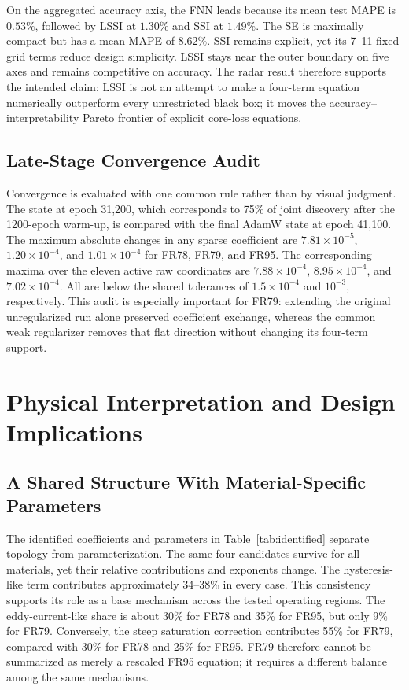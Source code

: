 \documentclass[lettersize,journal]{IEEEtran}
\begin{document}
On the aggregated accuracy axis, the FNN leads because its mean test MAPE is $0.53\%$, followed by LSSI at $1.30\%$ and SSI at $1.49\%$. The SE is maximally compact but has a mean MAPE of $8.62\%$. SSI remains explicit, yet its 7--11 fixed-grid terms reduce design simplicity. LSSI stays near the outer boundary on five axes and remains competitive on accuracy. The radar result therefore supports the intended claim: LSSI is not an attempt to make a four-term equation numerically outperform every unrestricted black box; it moves the accuracy--interpretability Pareto frontier of explicit core-loss equations.

\subsection{Late-Stage Convergence Audit}

Convergence is evaluated with one common rule rather than by visual judgment. The state at epoch 31,200, which corresponds to 75\% of joint discovery after the 1200-epoch warm-up, is compared with the final AdamW state at epoch 41,100. The maximum absolute changes in any sparse coefficient are $7.81\times10^{-5}$, $1.20\times10^{-4}$, and $1.01\times10^{-4}$ for FR78, FR79, and FR95. The corresponding maxima over the eleven active raw coordinates are $7.88\times10^{-4}$, $8.95\times10^{-4}$, and $7.02\times10^{-4}$. All are below the shared tolerances of $1.5\times10^{-4}$ and $10^{-3}$, respectively. This audit is especially important for FR79: extending the original unregularized run alone preserved coefficient exchange, whereas the common weak regularizer removes that flat direction without changing its four-term support.

\section{Physical Interpretation and Design Implications}
\subsection{A Shared Structure With Material-Specific Parameters}

The identified coefficients and parameters in Table~\ref{tab:identified} separate topology from parameterization. The same four candidates survive for all materials, yet their relative contributions and exponents change. The hysteresis-like term contributes approximately 34--38\% in every case. This consistency supports its role as a base mechanism across the tested operating regions. The eddy-current-like share is about 30\% for FR78 and 35\% for FR95, but only 9\% for FR79. Conversely, the steep saturation correction contributes 55\% for FR79, compared with 30\% for FR78 and 25\% for FR95. FR79 therefore cannot be summarized as merely a rescaled FR95 equation; it requires a different balance among the same mechanisms.
\end{document}
